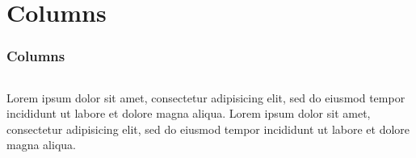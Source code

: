 \section{Columns}
\label{columns}
\begin{frame}\frametitle{Columns}
  \begin{columns}
      Lorem ipsum dolor sit amet, consectetur adipisicing elit, sed do eiusmod tempor incididunt ut labore et dolore magna aliqua.
      Lorem ipsum dolor sit amet, consectetur adipisicing elit, sed do eiusmod tempor incididunt ut labore et dolore magna aliqua.
  \end{columns}
\end{frame}